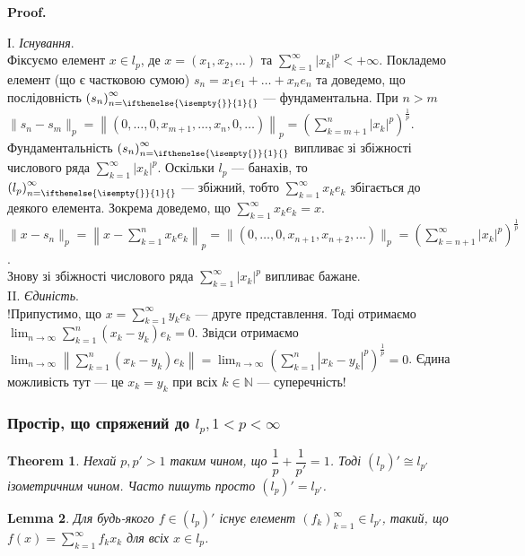 \documentclass[a4paper, 10pt]{article}
\makeatletter
\theoremstyle{theoremdd}
\newtheorem{theorem}{Theorem}[subsection]
\theoremstyle{theoremdd}
\theoremstyle{theoremdd}
\theoremstyle{theoremdd}
\theoremstyle{theoremdd}
\theoremstyle{theoremdd}
\theoremstyle{theoremdd}
\newtheorem{lemma}[theorem]{Lemma}
\theoremstyle{theoremdd}
\newcommand{\sequence}[2][]{\left({#2}\right)_{n=\ifthenelse{\isempty{#1}}{1}{#1}}^{\infty}}
\renewenvironment{proof}[1][Proof.\\]{\par
\pushQED{\hfill \qed}%
\normalfont \topsep6\p@\@plus6\p@\relax
\trivlist
\item\relax
{\bfseries
#1\@addpunct{.}}\hspace\labelsep\ignorespaces
}{%
\popQED\endtrivlist\@endpefalse
}
\makeatother
\begin{document}
\begin{proof}
І. \textit{Існування}.\\
Фіксуємо елемент $x \in l_p$, де $x = (x_1,x_2,\dots)$ та $\displaystyle\sum_{k=1}^\infty |x_k|^p < +\infty$. Покладемо елемент (що є частковою сумою) $s_n = x_1 e_1 + \dots + x_n e_n$ та доведемо, що послідовність $\sequence{s_n}$ --- фундаментальна. При $n > m$\\
$\|s_n - s_m \|_p = \left\| (0,\dots,0,x_{m+1},\dots,x_n,0,\dots ) \right\|_p = \displaystyle \left( \sum_{k=m+1}^n |x_k|^p \right)^{\frac{1}{p}}$.\\
Фундаментальність $\sequence{s_n}$ випливає зі збіжності числового ряда $\displaystyle\sum_{k=1}^\infty |x_k|^p$. Оскільки $l_p$ --- банахів, то $\sequence{l_p}$ --- збіжний, тобто $\displaystyle\sum_{k=1}^\infty x_k e_k$ збігається до деякого елемента. Зокрема доведемо, що $\displaystyle\sum_{k=1}^\infty x_k e_k = x$.\\
$\|x-s_n\|_p = \displaystyle \left\| x - \sum_{k=1}^n x_k e_k \right\|_p = \| (0,\dots,0,x_{n+1},x_{n+2},\dots)\|_p = \left( \sum_{k=n+1}^\infty |x_k|^p \right)^{\frac{1}{p}}$.\\
Знову зі збіжності числового ряда $\displaystyle\sum_{k=1}^\infty |x_k|^p$ випливає бажане.
\bigskip \\
II. \textit{Єдиність}.\\
!Припустимо, що $x = \displaystyle\sum_{k=1}^\infty y_k e_k$ --- друге представлення. Тоді отримаємо $\displaystyle\lim_{n \to \infty} \sum_{k=1}^n (x_k-y_k)e_k = 0$. Звідси отримаємо $\displaystyle\lim_{n \to \infty}\left\| \sum_{k=1}^n (x_k-y_k) e_k \right\| = \lim_{n \to \infty} \left(\sum_{k=1}^n |x_k-y_k|^p\right)^{\frac{1}{p}} = 0$. Єдина можливість тут --- це $x_k = y_k$ при всіх $k \in \mathbb{N}$ --- суперечність!
\end{proof}

\subsubsection{Простір, що спряжений до $l_p, 1 < p < \infty$}
\begin{theorem}
Нехай $p,p' > 1$ таким чином, що $\dfrac{1}{p} + \dfrac{1}{p'} = 1$. Тоді $(l_p)' \cong l_{p'}$ ізометричним чином. Часто пишуть просто $(l_p)' = l_{p'}$.
\end{theorem}

\begin{lemma}
Для будь-якого $f \in (l_p)'$ існує елемент $(f_k)_{k=1}^\infty \in l_{p'}$, такий, що $f(x) = \displaystyle\sum_{k=1}^\infty f_k x_k$ для всіх $x \in l_p$.
\end{lemma}
\end{document}
